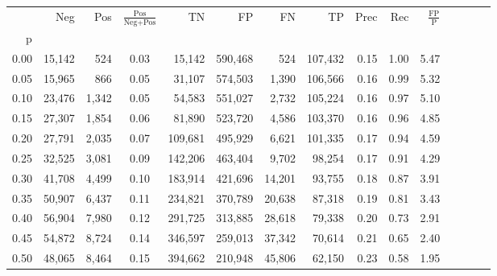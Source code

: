 \begin{tabular}{rrrcrrrrrrrrrrr}
\toprule
{} &     Neg &    Pos & $\frac{\text{Pos}}{\text{Neg}+\text{Pos}}$ &       TN &       FP &       FN &       TP &  Prec &   Rec & $\frac{\text{FP}}{\text{P}}$ \\
p    &         &        &                                            &          &          &          &          &       &       &                              \\
\midrule
0.00 &  15,142 &    524 &                                       0.03 &   15,142 &  590,468 &      524 &  107,432 &  0.15 &  1.00 &                         5.47 \\
0.05 &  15,965 &    866 &                                       0.05 &   31,107 &  574,503 &    1,390 &  106,566 &  0.16 &  0.99 &                         5.32 \\
0.10 &  23,476 &  1,342 &                                       0.05 &   54,583 &  551,027 &    2,732 &  105,224 &  0.16 &  0.97 &                         5.10 \\
0.15 &  27,307 &  1,854 &                                       0.06 &   81,890 &  523,720 &    4,586 &  103,370 &  0.16 &  0.96 &                         4.85 \\
0.20 &  27,791 &  2,035 &                                       0.07 &  109,681 &  495,929 &    6,621 &  101,335 &  0.17 &  0.94 &                         4.59 \\
0.25 &  32,525 &  3,081 &                                       0.09 &  142,206 &  463,404 &    9,702 &   98,254 &  0.17 &  0.91 &                         4.29 \\
0.30 &  41,708 &  4,499 &                                       0.10 &  183,914 &  421,696 &   14,201 &   93,755 &  0.18 &  0.87 &                         3.91 \\
0.35 &  50,907 &  6,437 &                                       0.11 &  234,821 &  370,789 &   20,638 &   87,318 &  0.19 &  0.81 &                         3.43 \\
0.40 &  56,904 &  7,980 &                                       0.12 &  291,725 &  313,885 &   28,618 &   79,338 &  0.20 &  0.73 &                         2.91 \\
0.45 &  54,872 &  8,724 &                                       0.14 &  346,597 &  259,013 &   37,342 &   70,614 &  0.21 &  0.65 &                         2.40 \\
0.50 &  48,065 &  8,464 &                                       0.15 &  394,662 &  210,948 &   45,806 &   62,150 &  0.23 &  0.58 &                         1.95 \\

\end{tabular}
